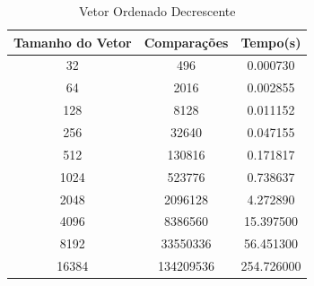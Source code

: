 \documentclass[12pt,a4paper,twoside]{report}
\begin{document}
\begin{table}[h]
  \centering
  \caption{Vetor Ordenado Decrescente \label{tab:od}}
  \begin{tabular}{ccc} \\\hline
  \textbf{Tamanho do Vetor} & \textbf{Comparações} & \textbf{Tempo(s)} \\\hline
  32                        & 496                  & 0.000730          \\\hline
  64                        & 2016                 & 0.002855          \\\hline
  128                       & 8128                 & 0.011152          \\\hline
  256                       & 32640                & 0.047155          \\\hline
  512                       & 130816               & 0.171817          \\\hline
  1024                      & 523776               & 0.738637          \\\hline
  2048                      & 2096128              & 4.272890          \\\hline
  4096                      & 8386560              & 15.397500         \\\hline
  8192                      & 33550336             & 56.451300       \\\hline
  16384                     & 134209536            & 254.726000        \\\hline
  \end{tabular}
\end{table}
\end{document}
